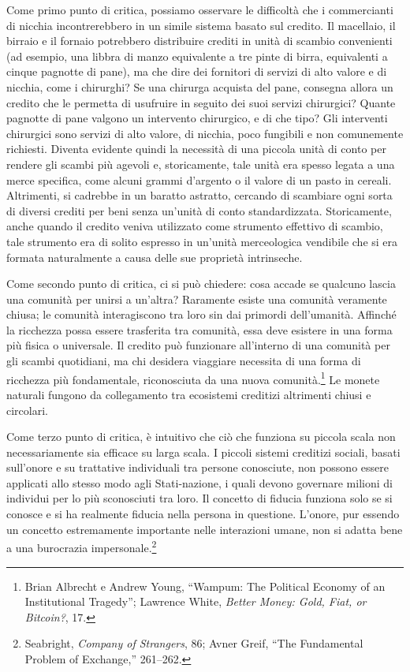 \documentclass[
  a5paper,
  smalldemyvopaper,10pt,twoside,onecolumn,openright,extrafontsizes,hidelinks]{memoir}
\begin{document}
Come primo punto di critica, possiamo osservare le difficoltà che i
commercianti di nicchia incontrerebbero in un simile sistema basato sul
credito. Il macellaio, il birraio e il fornaio potrebbero distribuire
crediti in unità di scambio convenienti (ad esempio, una libbra di manzo
equivalente a tre pinte di birra, equivalenti a cinque pagnotte di
pane), ma che dire dei fornitori di servizi di alto valore e di nicchia,
come i chirurghi? Se una chirurga acquista del pane, consegna allora un
credito che le permetta di usufruire in seguito dei suoi servizi
chirurgici? Quante pagnotte di pane valgono un intervento chirurgico, e
di che tipo? Gli interventi chirurgici sono servizi di alto valore, di
nicchia, poco fungibili e non comunemente richiesti. Diventa evidente
quindi la necessità di una piccola unità di conto per rendere gli scambi
più agevoli e, storicamente, tale unità era spesso legata a una merce
specifica, come alcuni grammi d'argento o il valore di un pasto in
cereali. Altrimenti, si cadrebbe in un baratto astratto, cercando di
scambiare ogni sorta di diversi crediti per beni senza un'unità di conto
standardizzata. Storicamente, anche quando il credito veniva utilizzato
come strumento effettivo di scambio, tale strumento era di solito
espresso in un'unità merceologica vendibile che si era formata
naturalmente a causa delle sue proprietà intrinseche.

Come secondo punto di critica, ci si può chiedere: cosa accade se
qualcuno lascia una comunità per unirsi a un'altra? Raramente esiste una
comunità veramente chiusa; le comunità interagiscono tra loro sin dai
primordi dell'umanità. Affinché la ricchezza possa essere trasferita tra
comunità, essa deve esistere in una forma più fisica o universale. Il
credito può funzionare all'interno di una comunità per gli scambi
quotidiani, ma chi desidera viaggiare necessita di una forma di
ricchezza più fondamentale, riconosciuta da una nuova
comunità.\footnote{Brian Albrecht e Andrew Young, ``Wampum: The
  Political Economy of an Institutional Tragedy''; Lawrence White,
  \emph{Better Money: Gold, Fiat, or Bitcoin?}, 17.} Le monete naturali
fungono da collegamento tra ecosistemi creditizi altrimenti chiusi e
circolari.

Come terzo punto di critica, è intuitivo che ciò che funziona su piccola
scala non necessariamente sia efficace su larga scala. I piccoli sistemi
creditizi sociali, basati sull'onore e su trattative individuali tra
persone conosciute, non possono essere applicati allo stesso modo agli
Stati-nazione, i quali devono governare milioni di individui per lo più
sconosciuti tra loro. Il concetto di fiducia funziona solo se si conosce
e si ha realmente fiducia nella persona in questione. L'onore, pur
essendo un concetto estremamente importante nelle interazioni umane, non
si adatta bene a una burocrazia impersonale.\footnote{Seabright,
  \emph{Company of Strangers}, 86; Avner Greif, ``The Fundamental
  Problem of Exchange,'' 261--262.}
\end{document}
